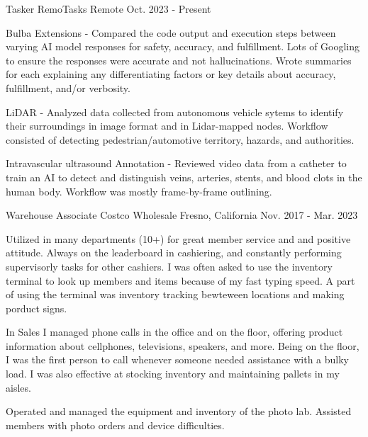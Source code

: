 

\begin{cventries}

  \cventry
    {Tasker} %
    {RemoTasks} %
    {Remote} %
    {Oct. 2023 - Present} %
    {
      \begin{cvitems} %
		  \item {Bulba Extensions - Compared the code output and execution steps between varying AI model responses for safety, accuracy, and fulfillment. Lots of Googling to ensure the responses were accurate and not hallucinations. Wrote summaries for each explaining any differentiating factors or key details about accuracy, fulfillment, and/or verbosity.}
		  \item {LiDAR - Analyzed data collected from autonomous vehicle sytems to identify their surroundings in image format and in Lidar-mapped nodes. Workflow consisted of detecting pedestrian/automotive territory, hazards, and authorities.}
		  \item {Intravascular ultrasound Annotation - Reviewed video data from a catheter to train an AI to detect and distinguish veins, arteries, stents, and blood clots in the human body. Workflow was mostly frame-by-frame outlining.}
      \end{cvitems}
    }

  \cventry
    {Warehouse Associate} %
    {Costco Wholesale} %
    {Fresno, California} %
    {Nov. 2017 - Mar. 2023} %
    {
      \begin{cvitems} %
	  \item {Utilized in many departments (10+) for great member service and and positive attitude. Always on the leaderboard in cashiering, and constantly performing supervisorly tasks for other cashiers. I was often asked to use the inventory terminal to look up members and items because of my fast typing speed. A part of using the terminal was inventory tracking bewteween locations and making porduct signs. }
	  \item {In Sales I managed phone calls in the office and on the floor, offering product information about cellphones, televisions, speakers, and more. Being on the floor, I was the first person to call whenever someone needed assistance with a bulky load. I was also effective at stocking inventory and maintaining pallets in my aisles.} 
	  \item {Operated and managed the equipment and inventory of the photo lab. Assisted members with photo orders and device difficulties.}
	  \end{cvitems}
}

\end{cventries}
